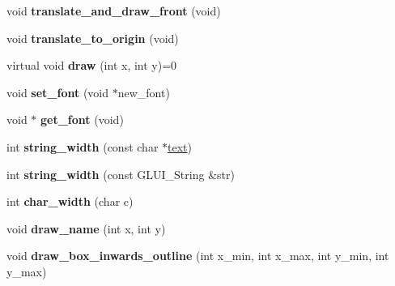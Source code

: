 \begin{DoxyCompactItemize}
\item 
\hypertarget{classGLUI__Control_ae0e46e41b11758295ae0f2d1c9372dda}{void {\bfseries translate\-\_\-and\-\_\-draw\-\_\-front} (void)}\label{classGLUI__Control_ae0e46e41b11758295ae0f2d1c9372dda}

\item 
\hypertarget{classGLUI__Control_a11ae15dcbb0ed5136b471a77eda41266}{void {\bfseries translate\-\_\-to\-\_\-origin} (void)}\label{classGLUI__Control_a11ae15dcbb0ed5136b471a77eda41266}

\item 
\hypertarget{classGLUI__Control_a2eb42d7a7951280ad2fe8c37972bf66a}{virtual void {\bfseries draw} (int x, int y)=0}\label{classGLUI__Control_a2eb42d7a7951280ad2fe8c37972bf66a}

\item 
\hypertarget{classGLUI__Control_ae317f3c30fbd4cad6bd91523c7e3e6b0}{void {\bfseries set\-\_\-font} (void $\ast$new\-\_\-font)}\label{classGLUI__Control_ae317f3c30fbd4cad6bd91523c7e3e6b0}

\item 
\hypertarget{classGLUI__Control_a4de7b5493bdac28905ede4c2fa3d5f08}{void $\ast$ {\bfseries get\-\_\-font} (void)}\label{classGLUI__Control_a4de7b5493bdac28905ede4c2fa3d5f08}

\item 
\hypertarget{classGLUI__Control_a57ed4e7d0b82e459fb713a9bf29db12b}{int {\bfseries string\-\_\-width} (const char $\ast$\hyperlink{classGLUI__Control_af0d60e9736f4dbc34e9a536e75876d72}{text})}\label{classGLUI__Control_a57ed4e7d0b82e459fb713a9bf29db12b}

\item 
\hypertarget{classGLUI__Control_a9d129d259e01c1b28f4fc7a7a7830189}{int {\bfseries string\-\_\-width} (const G\-L\-U\-I\-\_\-\-String \&str)}\label{classGLUI__Control_a9d129d259e01c1b28f4fc7a7a7830189}

\item 
\hypertarget{classGLUI__Control_ae56ff4899b691fc25332071f8f4c15f3}{int {\bfseries char\-\_\-width} (char c)}\label{classGLUI__Control_ae56ff4899b691fc25332071f8f4c15f3}

\item 
\hypertarget{classGLUI__Control_aacacd563742e3e48bc5f27643e4a514c}{void {\bfseries draw\-\_\-name} (int x, int y)}\label{classGLUI__Control_aacacd563742e3e48bc5f27643e4a514c}

\item 
\hypertarget{classGLUI__Control_adba9e88ff56a8ea0596e6b1ede3d4b9d}{void {\bfseries draw\-\_\-box\-\_\-inwards\-\_\-outline} (int x\-\_\-min, int x\-\_\-max, int y\-\_\-min, int y\-\_\-max)}\label{classGLUI__Control_adba9e88ff56a8ea0596e6b1ede3d4b9d}


\end{DoxyCompactItemize}
